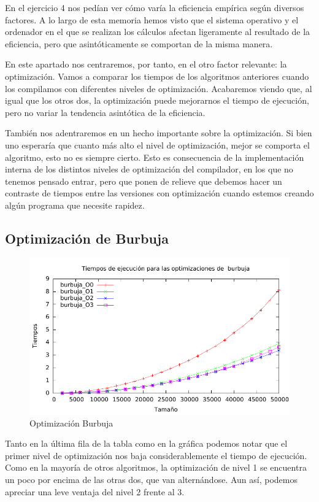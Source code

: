 \documentclass[a4paper, 11pt]{article}
\begin{document}
En el ejercicio 4 nos pedían ver cómo varía la eficiencia empírica según diversos factores. A lo largo de esta memoria hemos visto que el sistema operativo y el ordenador en el que se realizan los cálculos afectan ligeramente al resultado de la eficiencia, pero que asintóticamente se comportan de la misma manera.

En este apartado nos centraremos, por tanto, en el otro factor relevante: la optimización. Vamos a comparar los tiempos de los algoritmos anteriores cuando los compilamos con diferentes niveles de optimización. Acabaremos viendo que, al igual que los otros dos, la optimización puede mejorarnos el tiempo de ejecución, pero no variar la tendencia asintótica de la eficiencia.

También nos adentraremos en un hecho importante sobre la optimización. Si bien uno esperaría que cuanto más alto el nivel de optimización, mejor se comporta el algoritmo, esto no es siempre cierto. Esto es consecuencia de la implementación interna de los distintos niveles de optimización del compilador, en los que no tenemos pensado entrar, pero que ponen de relieve que debemos hacer un contraste de tiempos entre las versiones con optimización cuando estemos creando algún programa que necesite rapidez.

\newpage
\subsection{Optimización de Burbuja}

\begin{figure}[H]\includegraphics[width=13cm]{img/burbuja_optim_g.pdf} \centering
	\caption{Optimización Burbuja}\end{figure}

Tanto en la última fila de la tabla como en la gráfica podemos notar que el primer nivel de optimización nos baja considerablemente el tiempo de ejecución. Como en la mayoría de otros algoritmos, la optimización de nivel 1 se encuentra un poco por encima de las otras dos, que van alternándose. Aun así, podemos apreciar una leve ventaja del nivel 2 frente al 3.
\end{document}

